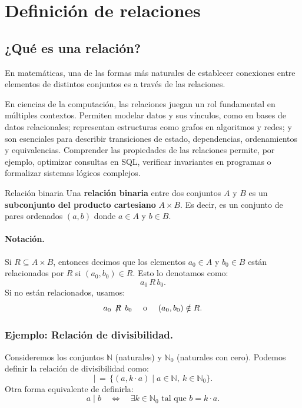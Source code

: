 \section{Definición de relaciones}

\subsection{¿Qué es una relación?}


En matemáticas, una de las formas más naturales de establecer conexiones entre elementos de distintos conjuntos es a través de las relaciones.

En ciencias de la computación, las relaciones juegan un rol fundamental en múltiples contextos. Permiten modelar datos y sus vínculos, como en bases de datos relacionales; representan estructuras como grafos en algoritmos y redes; y son esenciales para describir transiciones de estado, dependencias, ordenamientos y equivalencias. Comprender las propiedades de las relaciones permite, por ejemplo, optimizar consultas en SQL, verificar invariantes en programas o formalizar sistemas lógicos complejos.


\begin{definitionblock}{Relación binaria}
Una \textbf{relación binaria} entre dos conjuntos $A$ y $B$ es un \textbf{subconjunto del producto cartesiano} $A \times B$. Es decir, es un conjunto de pares ordenados $(a,b)$ donde $a \in A$ y $b \in B$.
\end{definitionblock}

\paragraph{Notación.} Si $R \subseteq A \times B$, entonces decimos que los elementos $a_0 \in A$ y $b_0 \in B$ están relacionados por $R$ si $(a_0, b_0) \in R$. Esto lo denotamos como:
\[ a_0 \, R \, b_0. \]
Si no están relacionados, usamos:
\[ a_0 \, \centernot R \, b_0 \quad \text{ o } \quad (a_0, b_0) \notin R. \]

\subsubsection*{Ejemplo: Relación de divisibilidad.} Consideremos los conjuntos $\mathbb{N}$ (naturales) y $\mathbb{N}_0$ (naturales con cero). Podemos definir la relación de divisibilidad como:
\[
\mid \,=\, \{ (a, k \cdot a) \mid a \in \mathbb{N},~k \in \mathbb{N}_0 \}.
\]
Otra forma equivalente de definirla:
\[
a \mid b \quad \Leftrightarrow \quad \exists k \in \mathbb{N}_0 \text{ tal que } b = k \cdot a.
\]

